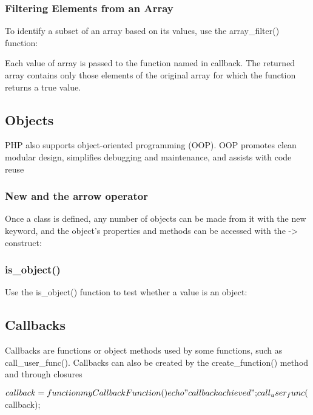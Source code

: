 \documentclass{report}
\begin{document}
\pagebreak 
\subsubsection{Filtering Elements from an Array}
\bigbreak \noindent 
To identify a subset of an array based on its values, use the array\_filter() function:
\bigbreak \noindent 
{}
\bigbreak \noindent 
Each value of array is passed to the function named in callback. The returned array contains only those elements of the original array for which the function returns a true value.

\pagebreak 
\subsection{Objects}
\bigbreak \noindent 
PHP also supports object-oriented programming (OOP). OOP promotes clean modular design, simplifies debugging and maintenance, and assists with code reuse
\bigbreak \noindent 
\subsubsection{New and the arrow operator}
Once a class is defined, any number of objects can be made from it with the new keyword, and the object’s properties and methods can be accessed with the -> construct:
\bigbreak \noindent 
{}

\bigbreak \noindent 
\subsubsection{is\_object()}
\bigbreak \noindent 
Use the is\_object() function to test whether a value is an object:
\bigbreak \noindent 
{}

\pagebreak 
\subsection{Callbacks}
\bigbreak \noindent 
Callbacks are functions or object methods used by some functions, such as call\_user\_func(). Callbacks can also be created by the create\_function() method and through closures
\bigbreak \noindent 
\begin{phpcode}
    $callback = function myCallbackFunction()
    {
        echo "callback achieved";
    }
    call_user_func($callback);
\end{phpcode}
\end{document}
